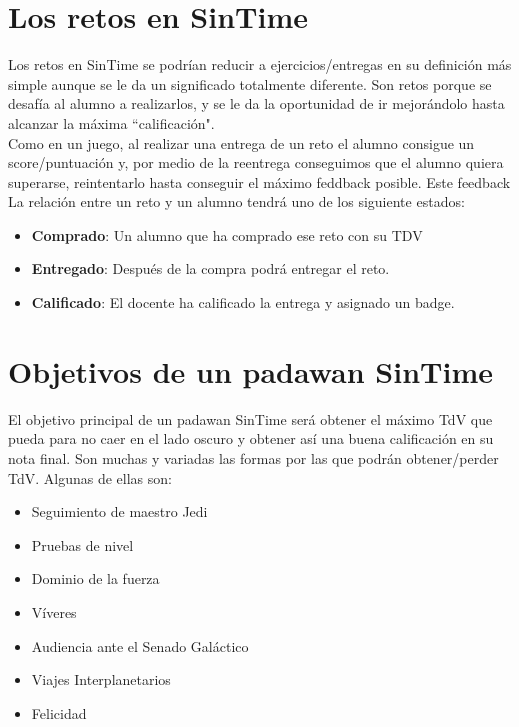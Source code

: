 \section{Los retos en SinTime}
Los retos en SinTime se podrían reducir a ejercicios/entregas en su definición más simple aunque se le da un significado totalmente diferente. Son retos porque se desafía al alumno a realizarlos, y se le da la oportunidad de ir mejorándolo hasta alcanzar la máxima ``calificación".\\

Como en un juego, al realizar una entrega de un reto el alumno consigue un score/puntuación y, por medio de la reentrega conseguimos que el alumno quiera superarse, reintentarlo hasta conseguir el máximo feddback posible. Este feedback \\

La relación entre un reto y un alumno tendrá uno de los siguiente estados:
\begin{itemize}
	\item \textbf{Comprado}: Un alumno que ha comprado ese reto con su TDV
	\item \textbf{Entregado}: Después de la compra podrá entregar el reto.
	\item \textbf{Calificado}: El docente ha calificado la entrega y asignado un badge.
\end{itemize}

\section{Objetivos de un padawan SinTime}

El objetivo principal de un padawan SinTime será obtener el máximo TdV que pueda para no caer en el lado oscuro y obtener así una buena calificación en su nota final. Son muchas y variadas las formas por las que podrán obtener/perder TdV. Algunas de ellas son:

\begin{itemize}
	\item Seguimiento de maestro Jedi
	\item Pruebas de nivel
	\item Dominio de la fuerza
	\item Víveres
	\item Audiencia ante el Senado Galáctico
	\item Viajes Interplanetarios
	\item Felicidad
\end{itemize}

